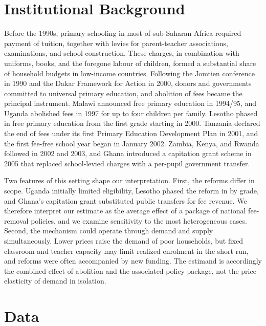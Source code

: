 \documentclass[12pt]{article}
\begin{document}
\section{Institutional Background}\label{sec:background}

Before the 1990s, primary schooling in most of sub-Saharan Africa required payment of tuition, together with levies for parent-teacher associations, examinations, and school construction. These charges, in combination with uniforms, books, and the foregone labour of children, formed a substantial share of household budgets in low-income countries. Following the Jomtien conference in 1990 and the Dakar Framework for Action in 2000, donors and governments committed to universal primary education, and abolition of fees became the principal instrument. Malawi announced free primary education in 1994/95, and Uganda abolished fees in 1997 for up to four children per family. Lesotho phased in free primary education from the first grade starting in 2000. Tanzania declared the end of fees under its first Primary Education Development Plan in 2001, and the first fee-free school year began in January 2002. Zambia, Kenya, and Rwanda followed in 2002 and 2003, and Ghana introduced a capitation grant scheme in 2005 that replaced school-levied charges with a per-pupil government transfer.

Two features of this setting shape our interpretation. First, the reforms differ in scope. Uganda initially limited eligibility, Lesotho phased the reform in by grade, and Ghana's capitation grant substituted public transfers for fee revenue. We therefore interpret our estimate as the average effect of a package of national fee-removal policies, and we examine sensitivity to the most heterogeneous cases. Second, the mechanism could operate through demand and supply simultaneously. Lower prices raise the demand of poor households, but fixed classroom and teacher capacity may limit realized enrolment in the short run, and reforms were often accompanied by new funding. The estimand is accordingly the combined effect of abolition and the associated policy package, not the price elasticity of demand in isolation.

\section{Data}\label{sec:data}
\end{document}
